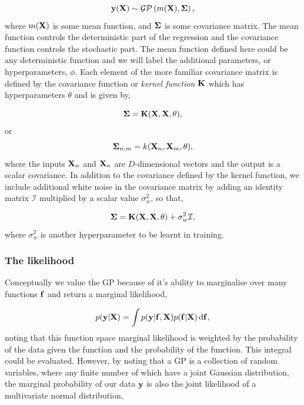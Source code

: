 \begin{equation}
{\bf y}({\bf X}) \sim \mathcal{GP}\left( m({\bf X}),  {\bf \Sigma}\right),
\end{equation}
where $m({\bf X})$ is some mean function, and $\bf \Sigma$ is some covariance matrix.  The mean function controls the deterministic part of the regression and the covariance function controls the stochastic part.  The mean function defined here could be any deterministic function and we will label the additional parameters, or hyperparameters, $\phi$.  Each element of the more familiar covariance matrix is defined by the covariance function or {\it kernel function} $\bf K$ which has hyperparameters $\theta$ and is given by,

\begin{equation}
{\bf \Sigma} = {\bf K}({\bf X}, {\bf X},  \theta),
\end{equation}
or 
\begin{equation}
{\bf \Sigma}_{n, m} = k({\bf X}_{n}, {\bf X}_{m},  \theta),
\end{equation}
where the inputs ${\bf X}_{n}$ and ${\bf X}_{n}$ are $D$-dimensional vectors and the output is a scalar covariance.
In addition to the covariance defined by the kernel function, we include additional white noise in the covariance matrix by adding an identity matrix $\mathcal{I}$ multiplied by a scalar value $\sigma_{w}^2$, so that, 

\begin{equation}
{\bf \Sigma} = {\bf K}({\bf X}, {\bf X},  \theta) + \sigma_{w}^{2} \mathcal{I},
\end{equation}
where $\sigma_{w}^2$ is another hyperparameter to be learnt in training. 

\subsubsection{The likelihood}
Conceptually we value the GP because of it's ability to marginalise over many functions $\bf f$ and return a marginal likelihood,

\begin{equation}
p({\bf y} | {\bf X}) = \int p({\bf y} | {\bf f}, {\bf X}) p({\bf f} | {\bf X}) \, {\rm d}{\bf f},
\end{equation}
noting that this function space marginal likelihood is weighted by the probability of the data given the function and the probability of the function.  This integral could be evaluated.  However, by noting that a GP is a collection of random variables, where any finite number of which have a joint Gaussian distribution, the marginal probability of our data $\bf y$ is also the joint likelihood of a multivariate normal distribution,

